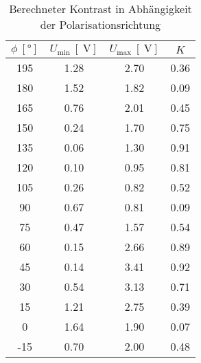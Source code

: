 \begin{table}
[H]
  \centering
\begin{tabular}{cccc}

  \toprule
$\phi \ [\si{\degree}]$ & $U_\text{min} \ [\SI{}{\volt}]$ &
$U_\text{max} \ [\SI{}{\volt}]$ & $K$ \\
\midrule

195 & \SI{1.28}{} & \SI{2.70}{} & \SI{0.36}{} \\

180 & \SI{1.52}{} & \SI{1.82}{} & \SI{0.09}{} \\

165 & \SI{0.76}{} & \SI{2.01}{} & \SI{0.45}{} \\

150 & \SI{0.24}{} & \SI{1.70}{} & \SI{0.75}{} \\

135 & \SI{0.06}{} & \SI{1.30}{} & \SI{0.91}{} \\

120 & \SI{0.10}{} & \SI{0.95}{} & \SI{0.81}{} \\

105 & \SI{0.26}{} & \SI{0.82}{} & \SI{0.52}{} \\

90  & \SI{0.67}{} & \SI{0.81}{} & \SI{0.09}{} \\

75  & \SI{0.47}{} & \SI{1.57}{} & \SI{0.54}{} \\

60  & \SI{0.15}{} & \SI{2.66}{} & \SI{0.89}{} \\

45  & \SI{0.14}{} & \SI{3.41}{} & \SI{0.92}{} \\

30  & \SI{0.54}{} & \SI{3.13}{} & \SI{0.71}{} \\

15  & \SI{1.21}{} & \SI{2.75}{} & \SI{0.39}{} \\

0   & \SI{1.64}{} & \SI{1.90}{} & \SI{0.07}{} \\

-15 & \SI{0.70}{} & \SI{2.00}{} & \SI{0.48}{} \\

\bottomrule
\end{tabular}

\caption{Berechneter Kontrast in Abhängigkeit der Polarisationsrichtung}
\label{tab:kontrast}
\end{table}

